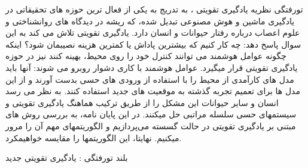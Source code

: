 


\pagestyle{empty}

‌تورفتگی
نظریه یادگیری تقویتی 
،
به تدریج به یکی از فعال ترین حوزه های تحقیقاتی در یادگیری ماشین و هوش مصنوعی تبدیل شده، که ریشه در دیدگاه های روانشناختی و علوم اعصاب درباره رفتار حیوانات و انسان دارد. یادگیری تقویتی تلاش می کند به این سوال پاسخ دهد: چه کار کنیم که بیشترین پاداش یا کمترین هزینه نصیبمان شود؟ اینکه چگونه عوامل هوشمند می توانند کنترل خود را روی محیط، بهینه کنند نیز در حوزه یادگیری تقویتی قرار می\nf گیرد. عوامل هوشمند با کاری دشوار روبرو می شوند: آنها باید مدل های کارآمدی از محیط را با استفاده از ورودی های حسی بدست آورند و از این مدل ها برای تعمیم تجربه گذشته به موقعیت های جدید استفاده کنند. به نظر می \nf رسد انسان و سایر حیوانات این مشکل را از طریق ترکیب هماهنگ یادگیری تقویتی و سیستم\nf های حسی سلسله مراتبی حل می\nf کنند. در این پایان نامه، به بررسی روش های مبتنی بر یادگیری تقویتی در حالت گسسته می‌پردازیم و الگوریتم\nf های مهم آن را مرور می\nf کنیم. نهایتا، این الگوریتم\nf ها را مقایسه خواهیم\nf کرد.

‌بلند
‌تورفتگی : 
یادگیری تقویتی
‌جدید

